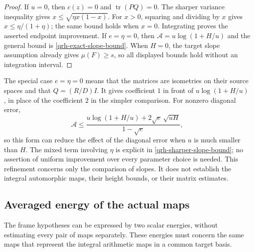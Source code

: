 \begin{proof}
If $u=0$, then $c(z)=0$ and
$\operatorname{tr}(PQ)=0$. The sharper variance inequality gives
$x\le\sqrt{\eta x(1-x)}$. For $x>0$, squaring and dividing by
$x$ gives $x\le\eta/(1+\eta)$; the same bound holds when $x=0$.
Integrating proves the asserted endpoint improvement. If $e=\eta=0$,
then $\mathcal A=u\log(1+H/u)$ and the general bound is
\eqref{qrh-exact-slope-bound}. When $H=0$, the target slope
assumption already gives $\mu(F)\ge s$, so all displayed bounds
hold without an integration interval.
\end{proof}

The special case $e=\eta=0$ means that the matrices are isometries
on their source spaces and that $Q=(R/D)I$. It gives coefficient
$1$ in front of $u\log(1+H/u)$, in place of the coefficient $2$
in the simpler comparison. For nonzero diagonal error,
\[
 \mathcal A\le
 \frac{u\log(1+H/u)+2\sqrt e\,\sqrt{uH}}{1-\sqrt e},
\]
so this form can reduce the effect of the diagonal error when
$u$ is much smaller than $H$. The mixed term involving $\eta$
is explicit in \eqref{qrh-sharper-slope-bound}; no assertion of
uniform improvement over every parameter choice is needed.
This refinement concerns only the comparison of slopes. It does
not establish the integral automorphic maps, their height bounds,
or their matrix estimates.


\subsection{Averaged energy of the actual maps}
\label{cs-averaged-theta-energy}

The frame hypotheses can be expressed by two scalar energies, without
estimating every pair of maps separately. These energies must concern
the same maps that represent the integral arithmetic maps in a common
target basis.

